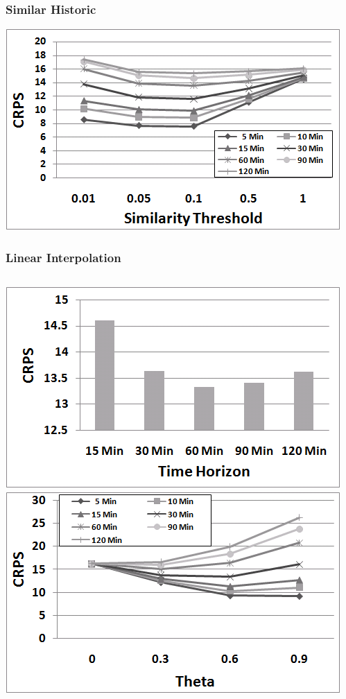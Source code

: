 \documentclass[t]{beamer}
\begin{document}
\begin{frame}\frametitle{Similar Historic}
\begin{center}
	\includegraphics[scale=0.5]{Links_Filtered.png}
\end{center}
\end{frame}

\begin{frame}\frametitle{Linear Interpolation}
\vspace{0.5in}
\begin{columns}
		\includegraphics[scale=0.3]{Links_Interpolated_TimeHorizon.png}
		\includegraphics[scale=0.3]{Links_Interpolated_Theta.png}
\end{columns}
\end{frame}
\end{document}

